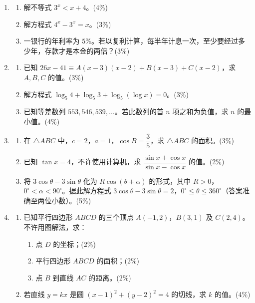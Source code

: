 \documentclass[12pt,a4paper]{exam-zh}
\begin{document}
\begin{enumerate}[leftmargin=2.2em,label=\arabic*.,start=6]
\item \begin{enumerate}[label=(\alph*),leftmargin=2em]
  \item 解不等式 $3^x<x+4$。\hfill (4\%)
  \item 解方程式 $4^x-3^x=x$。\hfill (3\%)
  \item 一银行的年利率为 $5\%$。若以复利计算，每半年计息一次，至少要经过多少年，存款才是本金的两倍？\hfill (3\%)
\end{enumerate}

\item \begin{enumerate}[label=(\alph*),leftmargin=2em]
  \item 已知 $26x-41\equiv A(x-3)(x-2)+B(x-3)+C(x-2)$，求 $A,B,C$ 的值。\hfill (3\%)
  \item 解方程式 $\log_5 4+\log_5 3+\log_5(\log x)=0$。\hfill (3\%)
  \item 已知等差数列 $553,546,539,\ldots$。若此数列的首 $n$ 项之和为负值，求 $n$ 的最小值。\hfill (4\%)
\end{enumerate}

\item \begin{enumerate}[label=(\alph*),leftmargin=2em]
  \item 在 $\triangle ABC$ 中，$c=2$，$a=1$，$\cos B=\dfrac35$，求 $\triangle ABC$ 的面积。\hfill (3\%)
  \item 已知 $\tan x=4$，不许使用计算机，求 $\dfrac{\sin x+\cos x}{\sin x-\cos x}$ 的值。\hfill (2\%)
  \item 将 $3\cos\theta-3\sin\theta$ 化为 $R\cos(\theta+\alpha)$ 的形式，其中 $R>0$，$0^\circ<\alpha<90^\circ$。据此解方程式 $3\cos\theta-3\sin\theta=2$，$0^\circ\le\theta\le360^\circ$（答案准确至两位小数）。\hfill (5\%)
\end{enumerate}

\item \begin{enumerate}[label=(\alph*),leftmargin=2em]
  \item 已知平行四边形 $ABCD$ 的三个顶点 $A(-1,2)$，$B(3,1)$ 及 $C(2,4)$。不许用图解法，求：
    \begin{enumerate}[label=(\roman*),leftmargin=2em]
      \item 点 $D$ 的坐标；\hfill (2\%)
      \item 平行四边形 $ABCD$ 的面积；\hfill (2\%)
      \item 点 $B$ 到直线 $AC$ 的距离。\hfill (2\%)
    \end{enumerate}
  \item 若直线 $y=kx$ 是圆 $(x-1)^2+(y-2)^2=4$ 的切线，求 $k$ 的值。\hfill (4\%)
\end{enumerate}
\end{enumerate}
\end{document}
